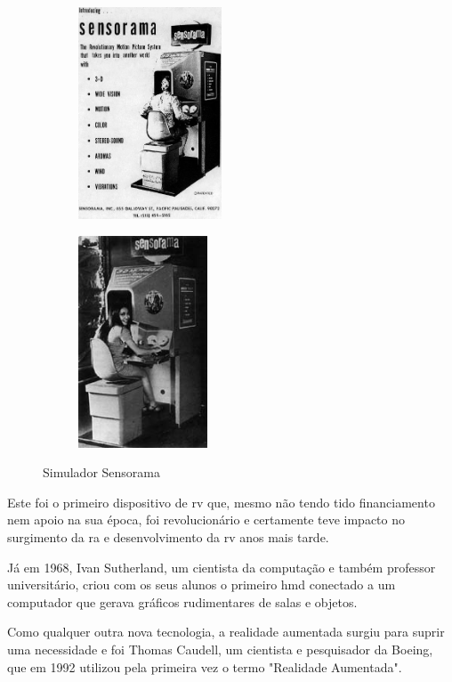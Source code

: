 \documentclass{report}
\begin{document}
\begin{figure}
    \centering
    \begin{subfigure}{.5\textwidth}
      \centering
      \includegraphics[height=17em]{sensorama.png}
      \label{Fig:sensorama0}
    \end{subfigure}%
    \begin{subfigure}{.5\textwidth}
      \centering
      \includegraphics[height=17em]{sensorama1.jpg}
      \label{Fig:sensorama1}
    \end{subfigure}
    \caption{Simulador Sensorama}
    \label{Fig:sensorama}
\end{figure}

Este foi o primeiro dispositivo de \ac{rv} que, mesmo não tendo tido financiamento nem apoio na sua época, foi revolucionário e certamente teve impacto no surgimento da \ac{ra} e desenvolvimento da \ac{rv} anos mais tarde.

Já em 1968, Ivan Sutherland, um cientista da computação e também professor universitário, criou com os seus alunos o primeiro \ac{hmd} conectado a um computador que gerava gráficos rudimentares de salas e objetos.\cite{virtualrealitysociety_2020}

Como qualquer outra nova tecnologia, a realidade aumentada surgiu para suprir uma necessidade e foi Thomas Caudell, um cientista e pesquisador da Boeing, que em 1992 utilizou pela primeira vez o termo "Realidade Aumentada".
\end{document}

